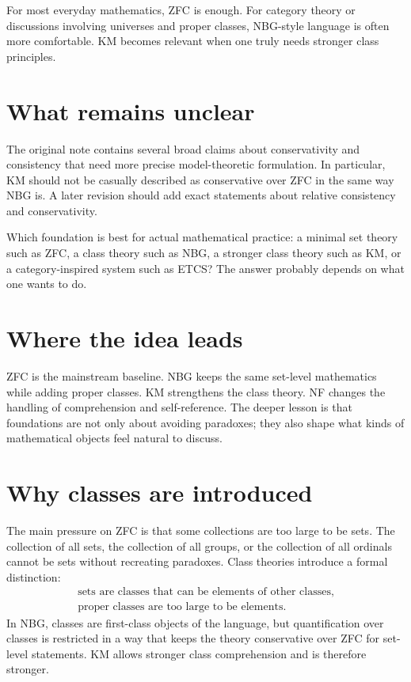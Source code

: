 For most everyday mathematics, ZFC is enough.  For category theory or discussions involving universes and proper classes, NBG-style language is often more comfortable.  KM becomes relevant when one truly needs stronger class principles.

\section{What remains unclear}

\begin{gap}
The original note contains several broad claims about conservativity and consistency that need more precise model-theoretic formulation.  In particular, KM should not be casually described as conservative over ZFC in the same way NBG is.  A later revision should add exact statements about relative consistency and conservativity.
\end{gap}

\begin{question}
Which foundation is best for actual mathematical practice: a minimal set theory such as ZFC, a class theory such as NBG, a stronger class theory such as KM, or a category-inspired system such as ETCS?  The answer probably depends on what one wants to do.
\end{question}

\section{Where the idea leads}

ZFC is the mainstream baseline.  NBG keeps the same set-level mathematics while adding proper classes.  KM strengthens the class theory.  NF changes the handling of comprehension and self-reference.  The deeper lesson is that foundations are not only about avoiding paradoxes; they also shape what kinds of mathematical objects feel natural to discuss.


\section{Why classes are introduced}

The main pressure on ZFC is that some collections are too large to be sets.  The collection of all sets, the collection of all groups, or the collection of all ordinals cannot be sets without recreating paradoxes.  Class theories introduce a formal distinction:
\[
\begin{gathered}
  \text{sets are classes that can be elements of other classes},\\
  \text{proper classes are too large to be elements}.
\end{gathered}
\]
In NBG, classes are first-class objects of the language, but quantification over classes is restricted in a way that keeps the theory conservative over ZFC for set-level statements.  KM allows stronger class comprehension and is therefore stronger.

